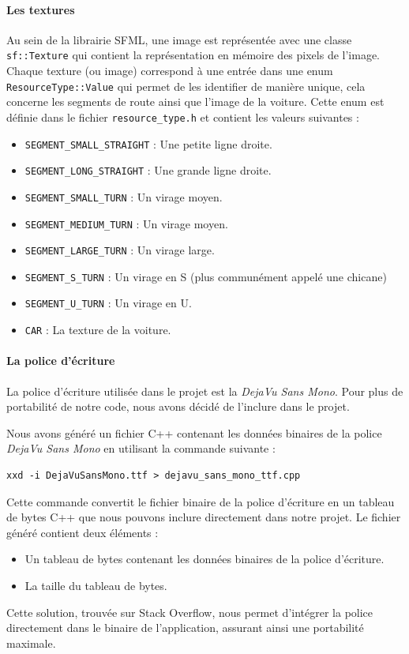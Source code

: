 \paragraph{Les textures}
Au sein de la librairie SFML, une image est représentée avec une classe \texttt{sf::Texture}\cite{sfml_sf_texture} qui contient la représentation en mémoire des pixels de l'image.
Chaque texture (ou image) correspond à une entrée dans une enum \texttt{ResourceType::Value} qui permet de les identifier de manière unique, cela concerne les segments de route ainsi que l'image de la voiture.
Cette enum est définie dans le fichier \texttt{resource\_type.h} et contient les valeurs suivantes :
\begin{itemize}
    \item \texttt{SEGMENT\_SMALL\_STRAIGHT} : Une petite ligne droite.
    \item \texttt{SEGMENT\_LONG\_STRAIGHT} : Une grande ligne droite.
    \item \texttt{SEGMENT\_SMALL\_TURN} : Un virage moyen.
    \item \texttt{SEGMENT\_MEDIUM\_TURN} : Un virage moyen.
    \item \texttt{SEGMENT\_LARGE\_TURN} : Un virage large.
    \item \texttt{SEGMENT\_S\_TURN} : Un virage en S (plus communément appelé une chicane)
    \item \texttt{SEGMENT\_U\_TURN} : Un virage en U\@.
    \item \texttt{CAR} : La texture de la voiture.
\end{itemize}

\paragraph{La police d'écriture}
La police d'écriture utilisée dans le projet est la \textit{DejaVu Sans Mono}.
Pour plus de portabilité de notre code, nous avons décidé de l'inclure dans le projet.

Nous avons généré un fichier C++ contenant les données binaires de la police \textit{DejaVu Sans Mono} en utilisant la commande suivante :
\begin{lstlisting}[style=BashStyle,label={lst:generation_dejavusansmonottf_h}]
xxd -i DejaVuSansMono.ttf > dejavu_sans_mono_ttf.cpp
\end{lstlisting}
Cette commande convertit le fichier binaire de la police d'écriture en un tableau de bytes C++ que nous pouvons inclure directement dans notre projet.
Le fichier généré contient deux éléments :
\begin{itemize}
    \item Un tableau de bytes contenant les données binaires de la police d'écriture.
    \item La taille du tableau de bytes.
\end{itemize}
Cette solution, trouvée sur Stack Overflow\cite{stackoverflow_embed_font}, nous permet d'intégrer la police directement dans le binaire de l'application, assurant ainsi une portabilité maximale.

